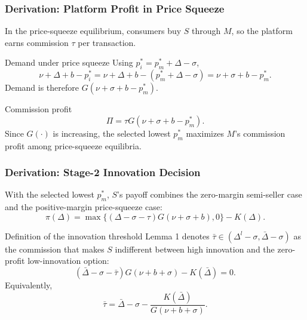 \begin{frame}
  \frametitle{Derivation: Platform Profit in Price Squeeze}
  \hypertarget{dual_profit_deriv}{}
  \footnotesize

  In the price-squeeze equilibrium, consumers buy $S$ through $M$, so the
  platform earns commission $\tau$ per transaction.

  \begin{block}{Demand under price squeeze}
    Using $p_i^*=p_m^*+\Delta-\sigma$,
    \[
      \nu+\Delta+b-p_i^*
      =
      \nu+\Delta+b-(p_m^*+\Delta-\sigma)
      =
      \nu+\sigma+b-p_m^*.
    \]
    Demand is therefore $G(\nu+\sigma+b-p_m^*)$.
  \end{block}

  \begin{block}{Commission profit}
    \[
      \Pi
      =
      \tau G(\nu+\sigma+b-p_m^*).
    \]
    Since $G(\cdot)$ is increasing, the selected lowest $p_m^*$ maximizes
    $M$'s commission profit among price-squeeze equilibria.
  \end{block}

  \hyperlink{dual_profit_src}{}
\end{frame}

\begin{frame}
  \frametitle{Derivation: Stage-2 Innovation Decision}
  \hypertarget{dual_s_profit_deriv}{}
  \hypertarget{dual_taubar_deriv}{}
  \footnotesize

  With the selected lowest $p_m^*$, $S$'s payoff combines the zero-margin
  semi-seller case and the positive-margin price-squeeze case:
  \[
    \pi(\Delta)=
    \max\{(\Delta-\sigma-\tau)G(\nu+\sigma+b),0\}-K(\Delta).
  \]

  \begin{block}{Definition of the innovation threshold}
    Lemma 1 denotes
    $\bar{\tau}\in(\Delta^l-\sigma,\bar{\Delta}-\sigma)$ as the commission
    that makes $S$ indifferent between high innovation and the zero-profit
    low-innovation option:
    \[
      (\bar{\Delta}-\sigma-\bar{\tau})G(\nu+b+\sigma)
      -K(\bar{\Delta})=0.
    \]
    Equivalently,
    \[
      \bar{\tau}
      =
      \bar{\Delta}-\sigma
      -
      \frac{K(\bar{\Delta})}{G(\nu+b+\sigma)}.
    \]
  \end{block}

  \hyperlink{dual_s_profit_src}{}
  \hyperlink{dual_taubar_src}{}
\end{frame}

